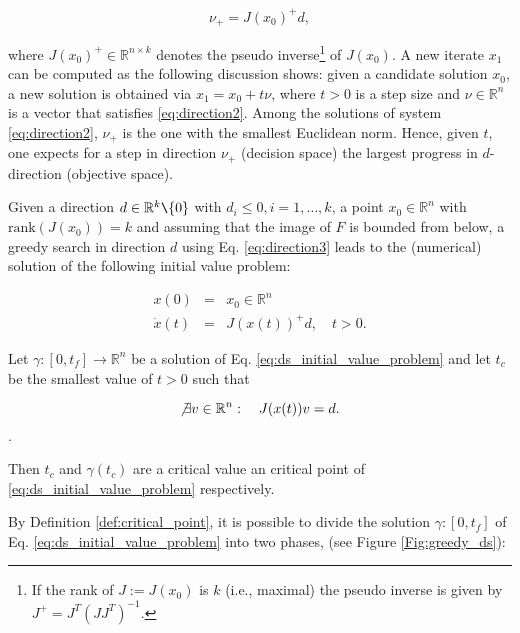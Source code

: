 \begin{equation}
	\nu_+ = J(x_0)^+d,
	\label{eq:direction3}
\end{equation}

where $ J(x_0)^+ \in \mathbb{R}^{n \times k}$ denotes the pseudo inverse\footnote{If the rank of $J := J(x_0)$ is $k$ (i.e., maximal) the pseudo inverse is given by $J^+ = J^T(JJ^T)^{-1}$.} of $J(x_0)$. A new iterate $x_1$ can be computed as the following discussion shows: given a candidate solution $x_0$, a new solution is obtained via $x_1 = x_0 + t\nu$, where $t > 0$ is a step size and $\nu \in \mathbb{R}^n$ is a vector that satisfies \eqref{eq:direction2}. Among the solutions of system \eqref{eq:direction2}, $\nu_+$ is the one with the smallest Euclidean norm. Hence, given $t$, one expects for a step in direction $\nu_+$ (decision space) the largest progress in $d$-direction (objective space).

Given a direction $d \in \mathbb{R}^k \texttt{\char`\\} \{0\}$ with $d_i \leq 0, i = 1, \ldots, k$, a point $x_0 \in \mathbb{R}^n$ with $\text{rank}(J(x_0)) = k$ and assuming that the image of $F$ is bounded from below, a greedy search in direction $d$ using Eq. \eqref{eq:direction3} leads to the (numerical) solution of the following initial value problem:

\begin{eqnarray}
		\label{eq:ds_initial_value_problem}
		x(0) & = & x_0 \in \mathbb{R}^n\\
		\dot{x}(t) & = & J(x(t))^+d,  \quad t > 0 \nonumber.
\end{eqnarray}

\vfill
\newpage

\begin{mydef}
\label{def:critical_point}

Let $\gamma:[0, t_f] \to \mathbb{R}^n$ be a solution of Eq. \eqref{eq:ds_initial_value_problem} and let $t_c$ be the smallest value of $t > 0$ such that

\begin{equation}
\not \exists v \in \mathbb{R}^n : \quad J(x(t))v = d.
\end{equation}.

Then $t_c$ and $\gamma(t_c)$ are a critical value an critical point of \eqref{eq:ds_initial_value_problem} respectively. 

\end{mydef}

By Definition \ref{def:critical_point}, it is possible to divide the solution $\gamma:[0, t_f]$ of Eq. \eqref{eq:ds_initial_value_problem} into two phases, (see Figure \ref{Fig:greedy_ds}):
	
